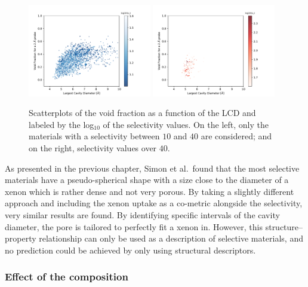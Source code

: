 \documentclass[main.tex]{subfiles}
\begin{document}
\begin{figure}[ht!]
  \centering
  \includegraphics[width=0.48\textwidth]{figures/2-thermo/Scatterplot_vf_lcd_selectivity.pdf}
  \includegraphics[width=0.48\textwidth]{figures/2-thermo/Scatterplot_vf_lcd_selectivity_zoom.pdf}  
  \caption{Scatterplots of the void fraction as a function of the LCD and labeled by the log$_{10}$ of the selectivity values. On the left, only the materials with a selectivity between $10$ and $40$ are considered; and on the right, selectivity values over $40$.}\label{fgr:lcd_vf}
\end{figure}


As presented in the previous chapter, Simon et al.\ found that the most selective materials have a pseudo-spherical shape with a size close to the diameter of a xenon which is rather dense and not very porous. By taking a slightly different approach and including the xenon uptake as a co-metric alongside the selectivity, very similar results are found. By identifying specific intervals of the cavity diameter, the pore is tailored to perfectly fit a xenon in. However, this structure--property relationship can only be used as a description of selective materials, and no prediction could be achieved by only using structural descriptors. 

\subsubsection{Effect of the composition}
\end{document}
